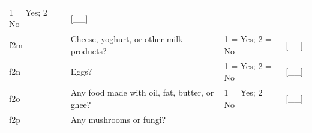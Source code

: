 \documentclass[12pt,a4paper]{book}
\theoremstyle{definition}
\theoremstyle{definition}
\theoremstyle{definition}
\theoremstyle{remark}
\begin{document}
\begin{longtable}[]{@{}llll@{}}
\begin{minipage}[t]{0.25\columnwidth}
1 = Yes; 2 = No\strut
\end{minipage} & \begin{minipage}[t]{0.13\columnwidth}\raggedright
{[}\_\_{]}\strut
\end{minipage}\tabularnewline
\begin{minipage}[t]{0.09\columnwidth}\raggedright
f2m\strut
\end{minipage} & \begin{minipage}[t]{0.41\columnwidth}\raggedright
Cheese, yoghurt, or other milk products?\strut
\end{minipage} & \begin{minipage}[t]{0.25\columnwidth}\raggedright
1 = Yes; 2 = No\strut
\end{minipage} & \begin{minipage}[t]{0.13\columnwidth}\raggedright
{[}\_\_{]}\strut
\end{minipage}\tabularnewline
\begin{minipage}[t]{0.09\columnwidth}\raggedright
f2n\strut
\end{minipage} & \begin{minipage}[t]{0.41\columnwidth}\raggedright
Eggs?\strut
\end{minipage} & \begin{minipage}[t]{0.25\columnwidth}\raggedright
1 = Yes; 2 = No\strut
\end{minipage} & \begin{minipage}[t]{0.13\columnwidth}\raggedright
{[}\_\_{]}\strut
\end{minipage}\tabularnewline
\begin{minipage}[t]{0.09\columnwidth}\raggedright
f2o\strut
\end{minipage} & \begin{minipage}[t]{0.41\columnwidth}\raggedright
Any food made with oil, fat, butter, or ghee?\strut
\end{minipage} & \begin{minipage}[t]{0.25\columnwidth}\raggedright
1 = Yes; 2 = No\strut
\end{minipage} & \begin{minipage}[t]{0.13\columnwidth}\raggedright
{[}\_\_{]}\strut
\end{minipage}\tabularnewline
\begin{minipage}[t]{0.09\columnwidth}\raggedright
f2p\strut
\end{minipage} & \begin{minipage}[t]{0.41\columnwidth}\raggedright
Any mushrooms or fungi?\strut
\end{minipage} & \begin{minipage}[t]{0.25\columnwidth}\raggedright

\end{minipage}
\end{longtable}
\end{document}
